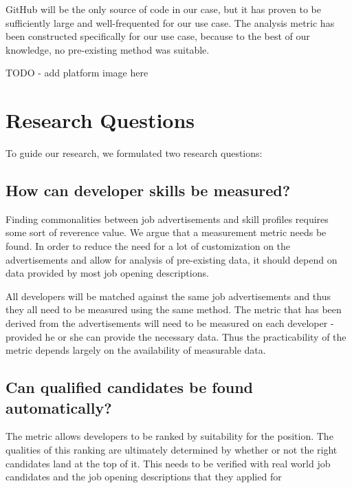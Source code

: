 GitHub will be the only source of code in our case, but it has proven to be sufficiently large and well-frequented for our use case. The analysis metric has been constructed specifically for our use case, because to the best of our knowledge, no pre-existing method was suitable.

TODO - add platform image here

\section{Research Questions}\label{sec:research-questions}
To guide our research, we formulated two research questions:

\subsection{How can developer skills be measured?}\label{subsec:dev-skill-measurement}
Finding commonalities between job advertisements and skill profiles
requires some sort of reverence value. We argue that a measurement
metric needs be found.
In order to reduce the need for a lot of customization
on the advertisements and allow for  analysis of pre-existing data,
it should depend on data provided by most job opening descriptions.
\newline

All developers will be matched against the same job advertisements
and thus they all need to be measured using the same method.
The metric that has been derived from the advertisements will need to be
measured on each developer - provided he or she can provide the
necessary data. Thus the practicability of the metric depends largely on
the availability of measurable data.

\subsection{Can qualified candidates be found automatically?}\label{subsec:measurement-quality}
The metric allows developers to be ranked by suitability for the position.
The qualities of this ranking are ultimately determined by whether
or not the right candidates land at the top of it. This needs to be
verified with real world job candidates and the job opening descriptions
that they applied for


